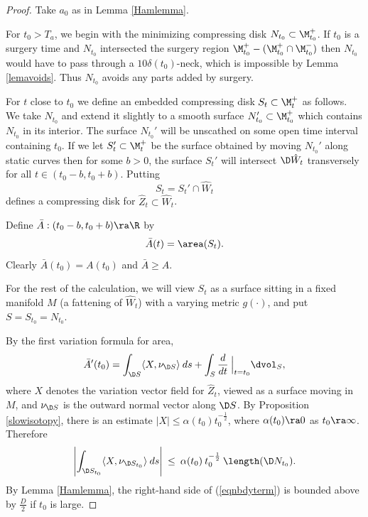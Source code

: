 \begin{proof}
Take $a_0$ as in Lemma \ref{Hamlemma}.

For $t_0 > T_a$,
we begin with the minimizing compressing disk $N_{t_0}\subset\M_{t_0}^+$.
If $t_0$ is a surgery time and $N_{t_0}$ intersected the surgery region $\M_{t_0}^+ -
(\M_{t_0}^+ \cap \M_{t_0}^-)$ then $N_{t_0}$ would have to pass through a
$10\delta(t_0)$-neck, which is impossible by Lemma \ref{lemavoids}.
Thus $N_{t_0}$ avoids any parts added by surgery.

For $t$ close to $t_0$ we define an embedded compressing disk $S_t\subset\M_t^+$
as follows. We take $N_{t_0}$
and extend it slightly to a smooth surface $N_{t_0}'\subset \M_{t_0}^+$ which contains
$N_{t_0}$ in its interior.  The surface $N_{t_0}'$ will
be unscathed on some open time interval containing $t_0$. If we let
$S_t'\subset \M_t^+$ be the  surface obtained by moving $N_{t_0}'$ along
static curves then for some $b>0$, the surface $S_t'$ will
intersect $\D \hat W_t$ transversely for all $t\in (t_0-b,t_0+b)$.
Putting
\begin{equation}
S_t =  S_t'\cap \hat W_t
\end{equation}
defines a compressing disk for $\hat Z_t\subset \hat W_t$.

Define $\bar A:(t_0-b,t_0+b)\ra \R$ by
\begin{equation}
\bar A(t) =  \area(S_t).
\end{equation}
Clearly $\bar A(t_0)=A(t_0)$ and $\bar A\geq A$.

For the rest of the calculation, we will view $S_t$ as a surface sitting
in a fixed manifold $M$ (a fattening of $\hat W_t$)
 with a varying metric $g(\cdot)$, and
put $S =  S_{t_0}=N_{t_0}$.

By the first variation formula for area,
\begin{equation}
\label{eqninitial}
\bar A'(t_0)=\int_{\D S}\langle X,\nu_{\D S}\rangle\:ds
+\int_S\frac{d}{dt} \: \Big|_{t=t_0} \dvol_S,
\end{equation}
where $X$ denotes the variation vector field for $\hat Z_t$, viewed
as a surface moving in $M$, and
$\nu_{\D S}$ is the outward normal vector along $\D S$.
By Proposition \ref{slowisotopy}, there is an estimate $|X|\leq \alpha(t_0)t_0^{-\frac12}$,
where $\alpha(t_0)\ra 0$ as $t_0 \ra \infty$.
Therefore
\begin{equation}
\label{eqnbdyterm}
\left|\int_{\D S_{t_0}}\langle X,\nu_{\D S_{t_0}}\rangle\:ds\right| \:
\leq \: \alpha(t_0) \: t_0^{-\frac12} \: \length(\D N_{t_0}).
\end{equation}
By Lemma \ref{Hamlemma}, the right-hand side of (\ref{eqnbdyterm})
is bounded above by $\frac{D}{2}$ if $t_0$ is large.


\end{proof}
